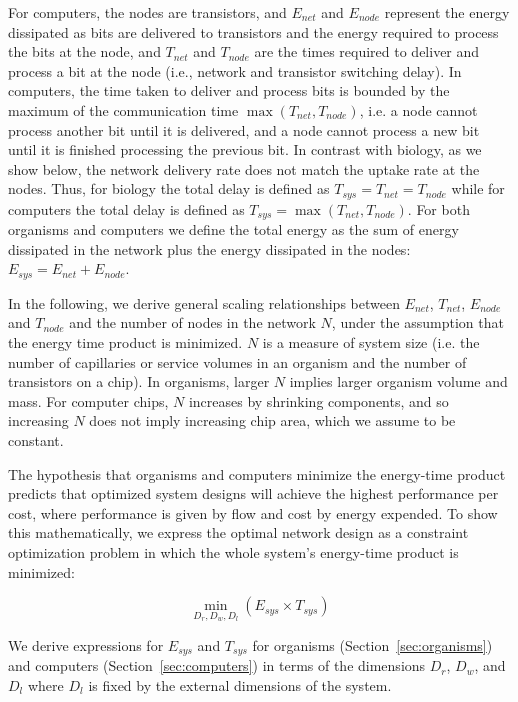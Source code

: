 \documentclass[12pt]{article}
\begin{document}
For computers, the nodes are transistors, and 
$E_{net}$ and $E_{node}$ represent the energy dissipated as bits are delivered
to transistors and the energy required to process the bits at the node, and
$T_{net}$ and $T_{node}$ are the times required to deliver and process a bit at
the node (i.e., network and transistor switching delay).  In computers, the time
taken to deliver and process bits is bounded by the maximum of the
communication time $\max(T_{net},T_{node})$, i.e. a node cannot process another
bit until it is delivered, and a node cannot process a new bit until it is finished
processing the previous bit. 
In contrast with biology, as we show below, the
network delivery rate does not match the uptake rate at the nodes.  Thus,  for
biology the total delay is defined as $T_{sys}=T_{net} = T_{node}$ while for
computers the total delay is defined as $T_{sys}=\max(T_{net},T_{node})$. For
both organisms and computers we define the total energy as the sum of energy
dissipated in the network plus the energy dissipated in the nodes: $E_{sys} =
E_{net} + E_{node}$.

In the following, we derive general scaling relationships between $E_{net}$,
$T_{net}$, $E_{node}$ and $T_{node}$ and the number of nodes in the network
$N$, under the assumption that the energy time product is minimized.  $N$ is a
measure of system size (i.e. the number of capillaries or service volumes in
an organism and the number of transistors on a chip). In organisms, larger $N$
implies larger organism volume and mass. For computer chips, $N$ increases by
shrinking components, and so increasing $N$ does not imply increasing chip
area, which we assume to be constant.

The hypothesis that organisms and computers minimize the energy-time product
predicts that optimized system designs will achieve
the highest performance per cost, where performance is given by flow and cost
by energy expended.  To show this mathematically, 
we express the optimal network design as a constraint optimization problem in
which the whole system's energy-time product is minimized:

\begin{equation}
  \min_{D_r,D_w,D_l}(E_{sys} \times T_{sys})
\label{eq:TheWholeEnchilada}
\end{equation}

\noindent We derive expressions for $E_{sys}$ and $T_{sys}$ for organisms
(Section~\ref{sec:organisms}) and computers (Section~\ref{sec:computers}) in terms of
the dimensions $D_r$, $D_w$, and $D_l$ where $D_l$ is fixed by the external
dimensions of the system.
\end{document}
